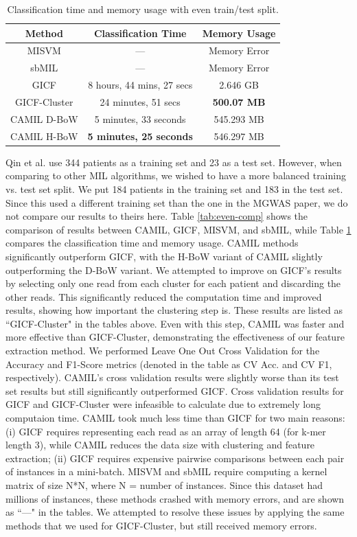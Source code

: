 \begin{table}[h]
\begin{center}
\caption{Classification time and memory usage with even train/test split.} 
\label{tab:time-comp}
\begin{tabular}{|c|cc|}\hline
Method & Classification Time & Memory Usage\\\hline
MISVM & --- & Memory Error\\\hline
sbMIL & --- & Memory Error\\\hline
GICF & 8 hours, 44 mins, 27 secs & 2.646 GB\\\hline
GICF-Cluster & 24 minutes, 51 secs & \bf{500.07 MB}\\\hline 
CAMIL D-BoW & 5 minutes, 33 seconds & 545.293 MB\\\hline
CAMIL H-BoW & \bf{5 minutes, 25 seconds} & 546.297 MB\\\hline
\end{tabular}
\end{center}
\end{table}

Qin et al. use 344 patients as a training set and 23 as a test set. However, when comparing to other MIL algorithms, we wished to have a more balanced training vs. test set split. We put 184 patients in the training set and 183 in the test set. Since this used a different training set than the one in the MGWAS paper, we do not compare our results to theirs here. Table \ref{tab:even-comp} shows the comparison of results between CAMIL, GICF, MISVM, and sbMIL, while Table \ref{tab:time-comp} compares the classification time and memory usage. CAMIL methods significantly outperform GICF, with the H-BoW variant of CAMIL slightly outperforming the D-BoW variant. We attempted to improve on GICF's results by selecting only one read from each cluster for each patient and discarding the other reads.  This significantly reduced the computation time and improved results, showing how important the clustering step is. These results are listed as ``GICF-Cluster" in the tables above. Even with this step, CAMIL was faster and more effective than GICF-Cluster, demonstrating the effectiveness of our feature extraction method. We performed Leave One Out Cross Validation for the Accuracy and F1-Score metrics (denoted in the table as CV Acc. and CV F1, respectively). CAMIL's cross validation results were slightly worse than its test set results but still significantly outperformed GICF. Cross validation results for GICF and GICF-Cluster were infeasible to calculate due to extremely long computaion time. CAMIL took much less time than GICF for two main reasons: (i) GICF requires representing each read as an array of length 64 (for k-mer length 3), while CAMIL reduces the data size with clustering and feature extraction; (ii) GICF requires expensive pairwise comparisons between each pair of instances in a mini-batch. MISVM and sbMIL require computing a kernel matrix of size N*N, where N = number of instances. Since this dataset had millions of instances, these methods crashed with memory errors, and are shown as ``---" in the tables. We attempted to resolve these issues by applying the same methods that we used for GICF-Cluster, but still received memory errors.

